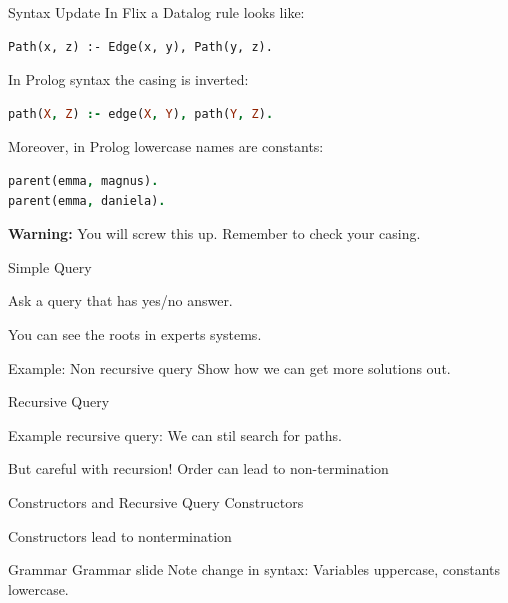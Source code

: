 \begin{frame}[fragile]{Syntax Update}
In Flix a Datalog rule looks like:
    
\begin{lstlisting}[language=flix, xleftmargin=0.5cm]
Path(x, z) :- Edge(x, y), Path(y, z).
\end{lstlisting}

In Prolog syntax the casing is inverted:

\begin{lstlisting}[language=prolog, xleftmargin=0.5cm]
path(X, Z) :- edge(X, Y), path(Y, Z).
\end{lstlisting}

\pause

Moreover, in Prolog lowercase names are constants:

\begin{lstlisting}[language=prolog, xleftmargin=0.5cm]
parent(emma, magnus).
parent(emma, daniela).
\end{lstlisting}

\pause

\textbf{Warning:} You will screw this up. Remember to check your casing. 
\end{frame}

\begin{frame}{Simple Query}

    Ask a query that has yes/no answer.

    You can see the roots in experts systems.
    
    Example: Non recursive query
    Show how we can get more solutions out.

    \end{frame}

\begin{frame}{Recursive Query}

Example recursive query: We can stil search for paths.

But careful with recursion! Order can lead to non-termination

\end{frame}

\begin{frame}{Constructors and Recursive Query}
Constructors

Constructors lead to nontermination
\end{frame}

\begin{frame}{Grammar}
Grammar slide
Note change in syntax: Variables uppercase, constants lowercase.
\end{frame}

